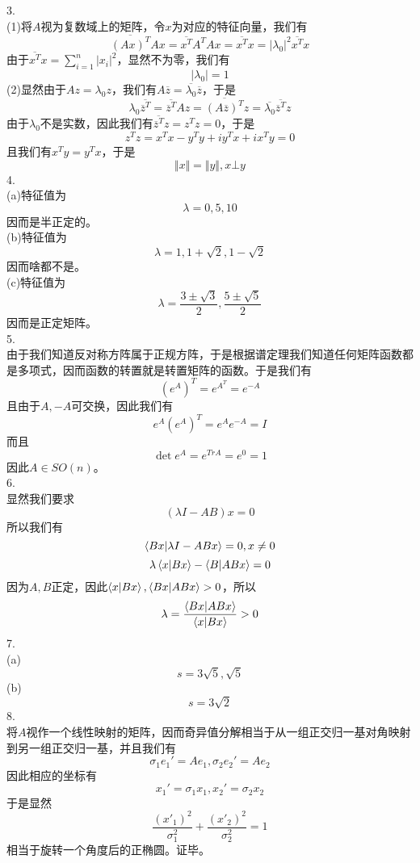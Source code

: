 \documentclass[utf8]{ctexart}
\begin{document}
3.\\
(1)将$A$视为复数域上的矩阵，令$x$为对应的特征向量，我们有
\[\overline{(Ax)^T}Ax=\overline{x^T}A^TAx=\overline{x^T}x=|\lambda_0|^2\overline{x^T}x\]
由于$\overline{x^T}x=\sum\limits_{i=1}^n|x_i|^2$，显然不为零，我们有
\[|\lambda_0|=1\]
(2)显然由于$Az=\lambda_0z$，我们有$A\overline{z}=\overline{\lambda_0}\overline{z}$，于是
\[\lambda_0\overline{\overline{z}^T}=\overline{\overline{z}^T}Az=\overline{(A\overline{z})^T}z=\overline{\lambda_0}\overline{\overline{z}^T}z\]
由于$\lambda_0$不是实数，因此我们有$\overline{\overline{z}^T}z=z^Tz=0$，于是
\[z^Tz=x^Tx-y^Ty+iy^Tx+ix^Ty=0\]
且我们有$x^Ty=y^Tx$，于是
\[\Vert x\Vert=\Vert y\Vert,x\bot y\]
4.\\
(a)特征值为
\[\lambda=0,5,10\]
因而是半正定的。\\
(b)特征值为
\[\lambda=1,1+\sqrt{2},1-\sqrt{2}\]
因而啥都不是。\\
(c)特征值为
\[\lambda=\frac{3\pm\sqrt{3}}{2},\frac{5\pm\sqrt{5}}{2}\]
因而是正定矩阵。\\
5.\\
由于我们知道反对称方阵属于正规方阵，于是根据谱定理我们知道任何矩阵函数都是多项式，因而函数的转置就是转置矩阵的函数。于是我们有
\[(e^A)^T=e^{A^T}=e^{-A}\]
且由于$A,-A$可交换，因此我们有
\[e^{A}(e^A)^T=e^Ae^{-A}=I\]
而且
\[\det e^A=e^{TrA}=e^0=1\]
因此$A\in SO(n)$。\\
6.\\
显然我们要求
\[(\lambda I-AB)x=0\]
所以我们有
\[\braket{Bx|\lambda I-ABx}=0,x\neq0\]
\[\lambda\braket{x|Bx}-\braket{B|ABx}=0\]
因为$A,B$正定，因此$\braket{x|Bx},\braket{Bx|ABx}>0$，所以
\[\lambda=\frac{\braket{Bx|ABx}}{\braket{x|Bx}}>0\]
7.\\
(a)\[s=3\sqrt{5},\sqrt{5}\]
(b)\[s=3\sqrt{2}\]
8.\\
将$A$视作一个线性映射的矩阵，因而奇异值分解相当于从一组正交归一基对角映射到另一组正交归一基，并且我们有
\[\sigma_1e_1'=Ae_1,\sigma_2e_2'=Ae_2\]
因此相应的坐标有
\[x_1'=\sigma_1x_1,x_2'=\sigma_2x_2\]
于是显然
\[\frac{(x'_1)^2}{\sigma_1^2}+\frac{(x'_2)^2}{\sigma_2^2}=1\]
相当于旋转一个角度后的正椭圆。证毕。
\end{document}
